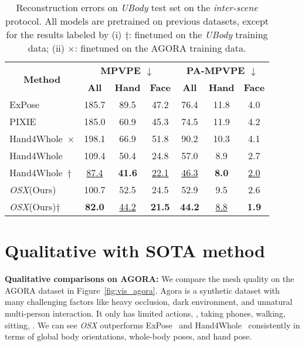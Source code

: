 \documentclass[10pt,twocolumn,letterpaper]{article}
\newcommand{\modelname}{\emph{OSX}\xspace}
\newcommand{\dataname}{\emph{UBody}\xspace}
\begin{document}
\begin{table}[h]
\centering
  \resizebox{\linewidth}{!}
{
    \begin{tabular}{l|ccc|ccc}
    \toprule
    \multicolumn{1}{c|}{\multirow{2}[4]{*}{\textbf{Method}}} & \multicolumn{3}{c|}{\boldmath{}\textbf{MPVPE $\downarrow$}\unboldmath{}} & \multicolumn{3}{c}{\boldmath{}\textbf{PA-MPVPE $\downarrow$}\unboldmath{}}\\
    \cmidrule{2-7}
    & \textbf{All} & \textbf{Hand} & \textbf{Face} & \textbf{All} & \textbf{Hand} & \textbf{Face} \\
    \midrule
ExPose~\cite{PavlakosGeorgios2020expose} &185.7 & 89.5 & 47.2 & 76.4 & 11.8 & 4.0 \\
PIXIE~\cite{Feng_2021_pixie} &185.0 & 60.9 & 45.3 & 74.5 & 11.9  & 4.2  \\
    Hand4Whole~\cite{GyeongsikMoon2020hand4whole}$\times$ &198.1&	66.9	&51.8 & 90.2&	10.3&	4.1 \\
    Hand4Whole~\cite{GyeongsikMoon2020hand4whole} &109.4 & {50.4} & 24.8 & 57.0 & {8.9}  & 2.7 \\
    Hand4Whole~\cite{GyeongsikMoon2020hand4whole}$\dagger$ &	\underline{87.4}&	\textbf{41.6}&	\underline{22.1}&\underline{46.3}&	\textbf{8.0}&\underline{2.0} \\
    
    \midrule
    \modelname (Ours) & {100.7} & 52.5  &{24.5} & {52.9}& 9.5 & {2.6}   \\
    \modelname (Ours)$\dagger$ & \textbf{82.0}&	\underline{44.2}&	\textbf{21.5}&\textbf{44.2}&\underline{8.8}&	\textbf{1.9} \\
    \bottomrule
    \end{tabular}}
    \vspace{-0.2cm}
  \caption[Reconstruction errors on the proposed \dataname test set.]{Reconstruction errors on \dataname test set on the \emph{inter-scene} protocol. All models are pretrained on previous datasets, except for the results labeled by (i) $\dagger$: finetuned on the \dataname training data; (ii) $\times$: finetuned on the AGORA training data. }
  \label{tab:3d_smplx_results_sup}\end{table}

\section{Qualitative with SOTA method}
\label{sec:visual}

\noindent\textbf{Qualitative comparisons on AGORA:} 
We compare the mesh quality on the AGORA dataset in Figure~\ref{fig:vis_agora}. Agora is a synthetic dataset with many challenging factors like heavy occlusion, dark environment, and unnatural multi-person interaction. It only has limited actions, \eg, taking phones, walking, sitting,  \etc. We can see \modelname outperforms ExPose~\cite{PavlakosGeorgios2020expose} and Hand4Whole~\cite{GyeongsikMoon2020hand4whole} consistently in terms of global body orientations, whole-body poses, and hand pose.    
\end{document}
